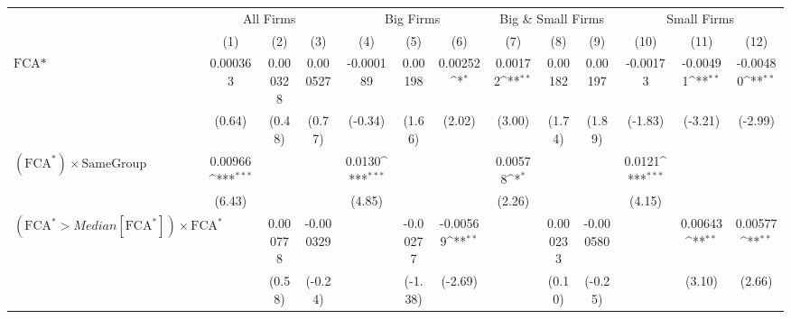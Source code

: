 {
\def\sym#1{\ifmmode^{#1}\else\(^{#1}\)\fi}
\begin{tabular}{l*{12}{c}}
\hline\hline
                &\multicolumn{3}{c}{All Firms}                           &\multicolumn{3}{c}{Big Firms}                           &\multicolumn{3}{c}{Big \& Small Firms}                  &\multicolumn{3}{c}{Small Firms}                         \\\cmidrule(lr){2-4}\cmidrule(lr){5-7}\cmidrule(lr){8-10}\cmidrule(lr){11-13}
                &\multicolumn{1}{c}{(1)}         &\multicolumn{1}{c}{(2)}         &\multicolumn{1}{c}{(3)}         &\multicolumn{1}{c}{(4)}         &\multicolumn{1}{c}{(5)}         &\multicolumn{1}{c}{(6)}         &\multicolumn{1}{c}{(7)}         &\multicolumn{1}{c}{(8)}         &\multicolumn{1}{c}{(9)}         &\multicolumn{1}{c}{(10)}         &\multicolumn{1}{c}{(11)}         &\multicolumn{1}{c}{(12)}         \\
\hline
$ \text{FCA*} $ & 0.000363         & 0.000328         & 0.000527         &-0.000189         &  0.00198         &  0.00252\sym{*}  &  0.00172\sym{**} &  0.00182         &  0.00197         & -0.00173         & -0.00491\sym{**} & -0.00480\sym{**} \\
                &   (0.64)         &   (0.48)         &   (0.77)         &  (-0.34)         &   (1.66)         &   (2.02)         &   (3.00)         &   (1.74)         &   (1.89)         &  (-1.83)         &  (-3.21)         &  (-2.99)         \\
[1em]
 $ (\text{FCA}^*) \times {\text{SameGroup} }  $ &  0.00966\sym{***}&                  &                  &   0.0130\sym{***}&                  &                  &  0.00578\sym{*}  &                  &                  &   0.0121\sym{***}&                  &                  \\
                &   (6.43)         &                  &                  &   (4.85)         &                  &                  &   (2.26)         &                  &                  &   (4.15)         &                  &                  \\
[1em]
 $ (\text{FCA}^* > Median[\text{FCA}^*]) \times {\text{FCA} ^*}  $ &                  & 0.000778         &-0.000329         &                  & -0.00277         & -0.00569\sym{**} &                  & 0.000233         &-0.000580         &                  &  0.00643\sym{**} &  0.00577\sym{**} \\
                &                  &   (0.58)         &  (-0.24)         &                  &  (-1.38)         &  (-2.69)         &                  &   (0.10)         &  (-0.25)         &                  &   (3.10)         &   (2.66)         \\

\end{tabular}}
